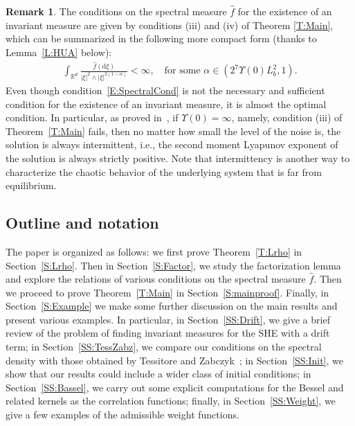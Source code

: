 \documentclass[a4paper,11pt]{article}%
\theoremstyle{plain}
\theoremstyle{definition}
\newtheorem{remark}[theorem]{Remark}
\numberwithin{equation}{section}
\newcommand{\R}{\mathbb{R}}
\newcommand{\ud}{\ensuremath{\mathrm{d}}}
\begin{document}
\begin{remark}\label{R:CompactForm}
  The conditions on the spectral measure $\widehat{f}$ for the existence of an invariant measure are
  given by conditions (iii) and (iv) of Theorem \ref{T:Main}, which can be summarized in the
  following more compact form (thanks to Lemma~\ref{L:HUA} below):
  \begin{align}\label{E:SpectralCond}
    \int_{\R^d} \frac{\widehat{f}(\ud\xi)}{|\xi|^2 \wedge |\xi|^{2(1-\alpha)}}<\infty,
    \quad \text{for some $\alpha\in \left(2^7\Upsilon(0)L_b^2,1\right)$.}
  \end{align}
  Even though condition~\eqref{E:SpectralCond} is not the necessary and sufficient condition for the
  existence of an invariant measure, it is almost the optimal condition. In particular, as proved
  in~\cite{chen.kim:19:nonlinear}, if $\Upsilon(0) = \infty$, namely, condition (iii) of
  Theorem~\ref{T:Main} fails, then no matter how small the level of the noise is, the solution is
  always intermittent, i.e., the second moment Lyapunov exponent of the solution is always strictly
  positive. Note that intermittency is another way to characterize the chaotic behavior of the
  underlying system that is far from equilibrium.
\end{remark}

\subsection{Outline and notation}

The paper is organized as follows: we first prove Theorem~\ref{T:Lrho} in Section~\ref{S:Lrho}. Then
in Section~\ref{S:Factor}, we study the factorization lemma and explore the relations of various
conditions on the spectral measure $\widehat{f}$. Then we proceed to prove Theorem~\ref{T:Main} in
Section~\ref{S:mainproof}. Finally, in Section~\ref{S:Example} we make some further discussion on
the main results and present various examples. In particular, in Section~\ref{SS:Drift}, we give a
brief review of the problem of finding invariant measures for the SHE with a drift term; in
Section~\ref{SS:TessZabz}, we compare our conditions on the spectral density with those obtained by
Tessitore and Zabczyk~\cite{tessitore.zabczyk:98:invariant}; in Section~\ref{SS:Init}, we show that
our results could include a wider class of initial conditions; in Section~\ref{SS:Bassel}, we carry
out some explicit computations for the Bessel and related kernels as the correlation functions;
finally, in Section~\ref{SS:Weight}, we give a few examples of the admissible weight functions.
\end{document}
